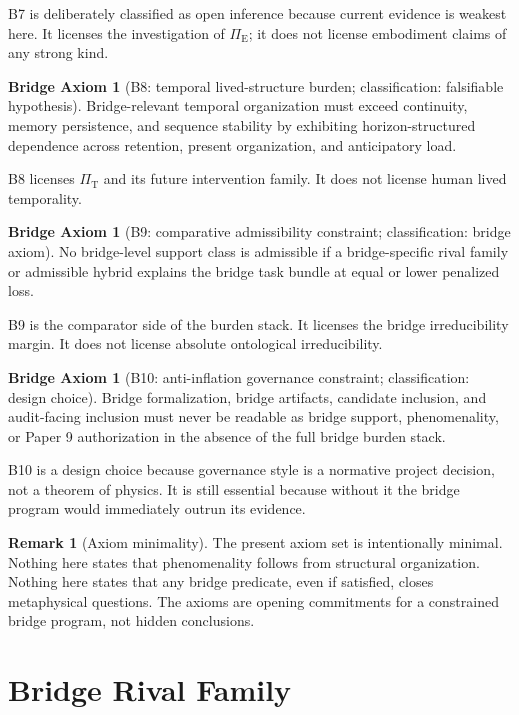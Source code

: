 \documentclass[11pt,a4paper]{article}
\theoremstyle{definition}
\newtheorem{remark}[theorem]{Remark}
\newtheorem{axiom}[theorem]{Bridge Axiom}
\newcommand{\PiE}{\Pi_{\mathrm{E}}}
\newcommand{\PiT}{\Pi_{\mathrm{T}}}
\begin{document}
B7 is deliberately classified as open inference because current evidence is weakest here. It licenses the investigation of $\PiE$; it does not license embodiment claims of any strong kind.

\begin{axiom}[B8: temporal lived-structure burden; classification: falsifiable hypothesis]
Bridge-relevant temporal organization must exceed continuity, memory persistence, and sequence stability by exhibiting horizon-structured dependence across retention, present organization, and anticipatory load.
\end{axiom}

B8 licenses $\PiT$ and its future intervention family. It does not license human lived temporality.

\begin{axiom}[B9: comparative admissibility constraint; classification: bridge axiom]
No bridge-level support class is admissible if a bridge-specific rival family or admissible hybrid explains the bridge task bundle at equal or lower penalized loss.
\end{axiom}

B9 is the comparator side of the burden stack. It licenses the bridge irreducibility margin. It does not license absolute ontological irreducibility.

\begin{axiom}[B10: anti-inflation governance constraint; classification: design choice]
Bridge formalization, bridge artifacts, candidate inclusion, and audit-facing inclusion must never be readable as bridge support, phenomenality, or Paper 9 authorization in the absence of the full bridge burden stack.
\end{axiom}

B10 is a design choice because governance style is a normative project decision, not a theorem of physics. It is still essential because without it the bridge program would immediately outrun its evidence.

\begin{remark}[Axiom minimality]
The present axiom set is intentionally minimal. Nothing here states that phenomenality follows from structural organization. Nothing here states that any bridge predicate, even if satisfied, closes metaphysical questions. The axioms are opening commitments for a constrained bridge program, not hidden conclusions.
\end{remark}

\section{Bridge Rival Family}
\end{document}
